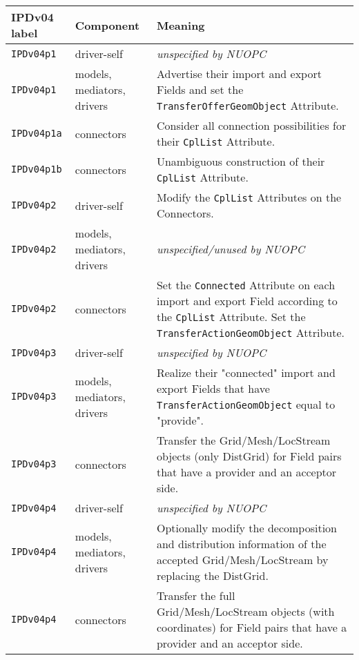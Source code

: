 \vspace*{3ex}
\begin{longtable}[h]{|p{35mm}|p{4cm}|p{6cm}|}
     \hline\hline
     {\bf IPDv04 label} & {\bf Component} & {\bf Meaning}\\
     \hline\hline
     {\tt IPDv04p1}   & driver-self                 & {\em unspecified by NUOPC}\\ \hline
     {\tt IPDv04p1}   & models, mediators, drivers  & Advertise their import and export Fields and set the {\tt TransferOfferGeomObject} Attribute.\\ \hline
     {\tt IPDv04p1a}  & connectors                  & Consider all connection possibilities for their {\tt CplList} Attribute.\\ \hline
     {\tt IPDv04p1b}  & connectors                  & Unambiguous construction of their {\tt CplList} Attribute.\\ \hline
     {\tt IPDv04p2}   & driver-self                 & Modify the {\tt CplList} Attributes on the Connectors.\\ \hline
     {\tt IPDv04p2}   & models, mediators, drivers  & {\em unspecified/unused by NUOPC}\\ \hline
     {\tt IPDv04p2}   & connectors                  & Set the {\tt Connected} Attribute on each import and export Field according to the {\tt CplList} Attribute. Set the {\tt TransferActionGeomObject} Attribute.\\ \hline
     {\tt IPDv04p3}   & driver-self                 & {\em unspecified by NUOPC}\\ \hline
     {\tt IPDv04p3}   & models, mediators, drivers  & Realize their "connected" import and export Fields that have {\tt TransferActionGeomObject} equal to "provide".\\ \hline
     {\tt IPDv04p3}   & connectors                  & Transfer the Grid/Mesh/LocStream objects (only DistGrid) for Field pairs that have a provider and an acceptor side.\\ \hline
     {\tt IPDv04p4}   & driver-self                 & {\em unspecified by NUOPC}\\ \hline
     {\tt IPDv04p4}   & models, mediators, drivers  & Optionally modify the decomposition and distribution information of the accepted Grid/Mesh/LocStream by replacing the DistGrid.\\ \hline
     {\tt IPDv04p4}   & connectors                  & Transfer the full Grid/Mesh/LocStream objects (with coordinates) for Field pairs that have a provider and an acceptor side.\\ \hline

\end{longtable}
